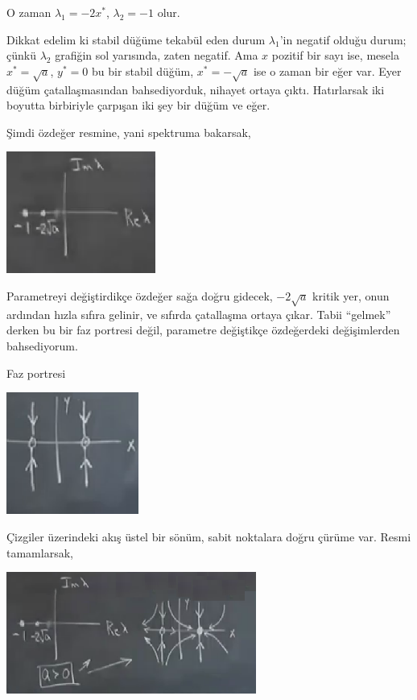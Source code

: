 \documentclass[12pt,fleqn]{article}\usepackage{../../common}
\begin{document}
O zaman $\lambda_1 = -2x^*$, $\lambda_2 = -1$ olur.

Dikkat edelim ki stabil düğüme tekabül eden durum $\lambda_1$'in negatif olduğu
durum; çünkü $\lambda_2$ grafiğin sol yarısında, zaten negatif. Ama $x$ pozitif
bir sayı ise, mesela $x^* = \sqrt{a}$, $y^*=0$ bu bir stabil düğüm, $x^* =
-\sqrt{a}$ ise o zaman bir eğer var. Eyer düğüm çatallaşmasından bahsediyorduk,
nihayet ortaya çıktı. Hatırlarsak iki boyutta birbiriyle çarpışan iki şey bir
düğüm ve eğer.

Şimdi özdeğer resmine, yani spektruma bakarsak, 

\includegraphics[height=4cm]{12_11.png}

Parametreyi değiştirdikçe özdeğer sağa doğru gidecek, $-2\sqrt{a}$ kritik yer,
onun ardından hızla sıfıra gelinir, ve sıfırda çatallaşma ortaya çıkar. Tabii
``gelmek'' derken bu bir faz portresi değil, parametre değiştikçe özdeğerdeki
değişimlerden bahsediyorum.

Faz portresi

\includegraphics[height=4cm]{12_12.png}

Çizgiler üzerindeki akış üstel bir sönüm, sabit noktalara doğru çürüme
var. Resmi tamamlarsak,

\includegraphics[height=4cm]{12_13.png}
\end{document}

